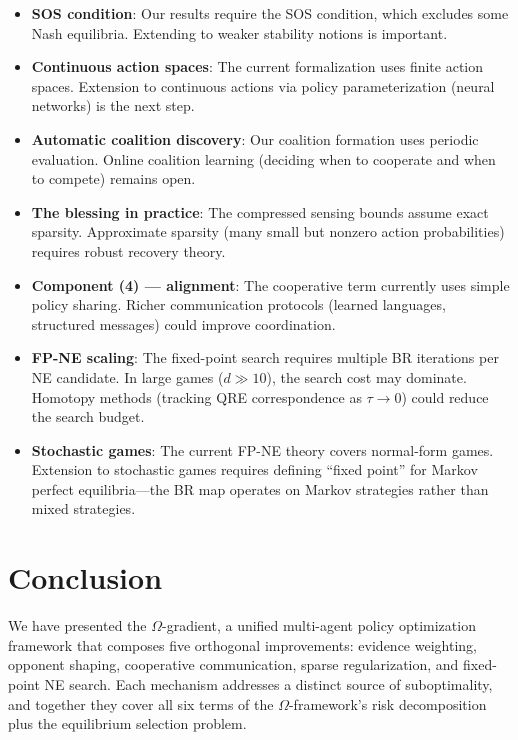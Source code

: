 \documentclass[11pt,a4paper]{article}
\begin{document}
\begin{itemize}
    \item \textbf{SOS condition}: Our results require the SOS condition,
    which excludes some Nash equilibria. Extending to weaker stability
    notions is important.

    \item \textbf{Continuous action spaces}: The current formalization
    uses finite action spaces. Extension to continuous actions via
    policy parameterization (neural networks) is the next step.

    \item \textbf{Automatic coalition discovery}: Our coalition
    formation uses periodic evaluation. Online coalition learning
    (deciding when to cooperate and when to compete) remains open.

    \item \textbf{The blessing in practice}: The compressed sensing
    bounds assume exact sparsity. Approximate sparsity (many small
    but nonzero action probabilities) requires robust recovery theory.

    \item \textbf{Component (4) --- alignment}: The cooperative term
    currently uses simple policy sharing. Richer communication protocols
    (learned languages, structured messages) could improve coordination.

    \item \textbf{FP-NE scaling}: The fixed-point search requires
    multiple BR iterations per NE candidate. In large games ($d \gg 10$),
    the search cost may dominate. Homotopy methods (tracking QRE
    correspondence as $\tau \to 0$) could reduce the search budget.

    \item \textbf{Stochastic games}: The current FP-NE theory covers
    normal-form games. Extension to stochastic games requires defining
    ``fixed point'' for Markov perfect equilibria---the BR map operates
    on Markov strategies rather than mixed strategies.
\end{itemize}


\section{Conclusion}

We have presented the $\Omega$-gradient, a unified multi-agent policy
optimization framework that composes five orthogonal improvements:
evidence weighting, opponent shaping, cooperative communication, sparse
regularization, and fixed-point NE search. Each mechanism addresses a
distinct source of suboptimality, and together they cover all six terms
of the $\Omega$-framework's risk decomposition plus the equilibrium
selection problem.
\end{document}
